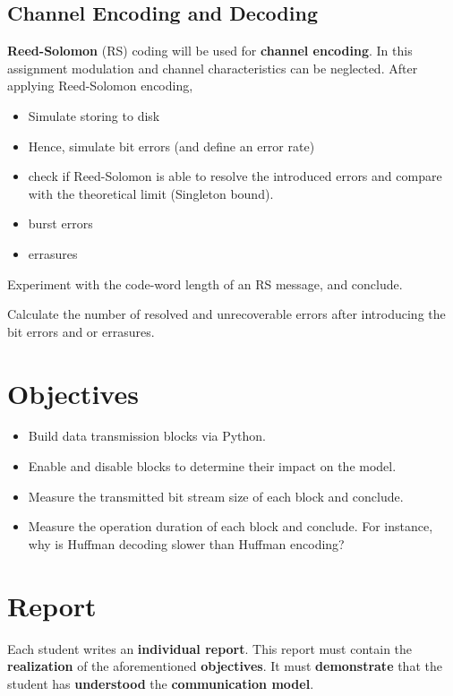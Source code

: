 \documentclass[12pt,a4paper]{article}
\begin{document}
\subsection{Channel Encoding and Decoding}
\textbf{Reed-Solomon} (RS) coding will be used for \textbf{channel encoding}. 
In this assignment modulation and channel characteristics can be neglected.
After applying Reed-Solomon encoding, 
\begin{itemize}
	\item Simulate storing to disk
	\item Hence, simulate bit errors (and define an error rate)
	\item check if Reed-Solomon is able to resolve the introduced errors and compare with the theoretical limit (Singleton bound).
	\item burst errors
	\item errasures
\end{itemize}

\begin{question}
	Experiment with the code-word length of an RS message, and conclude.%
\end{question}

\begin{question}
	Calculate the number of resolved and unrecoverable errors after introducing the bit errors and or errasures.
\end{question}
 

\section{Objectives}
\begin{itemize}
	\item Build data transmission blocks via Python.%
	\item Enable and disable blocks to determine their impact on the model.%
	\item Measure the transmitted bit stream size of each block and conclude.
	\item Measure the operation duration of each block and conclude.
	For instance, why is Huffman decoding slower than Huffman encoding?
\end{itemize}

\section{Report}
Each student writes an \textbf{individual report}. This report must contain the \textbf{realization} of the aforementioned \textbf{objectives}. It must \textbf{demonstrate} that the student has \textbf{understood} the \textbf{communication model}. 
\end{document}
